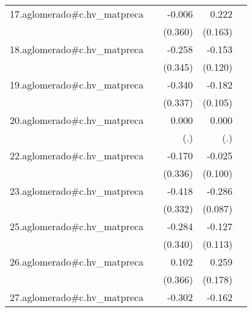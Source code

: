 {\begin{longtable}{l*{4}{D{.}{.}{-1}}}
\addlinespace
17.aglomerado#c.hv\_matpreca&                     &      -0.006         &       0.222         &                     \\
            &                     &     (0.360)         &     (0.163)         &                     \\
\addlinespace
18.aglomerado#c.hv\_matpreca&                     &      -0.258         &      -0.153         &                     \\
            &                     &     (0.345)         &     (0.120)         &                     \\
\addlinespace
19.aglomerado#c.hv\_matpreca&                     &      -0.340         &      -0.182         &                     \\
            &                     &     (0.337)         &     (0.105)         &                     \\
\addlinespace
20.aglomerado#c.hv\_matpreca&                     &       0.000         &       0.000         &                     \\
            &                     &         (.)         &         (.)         &                     \\
\addlinespace
22.aglomerado#c.hv\_matpreca&                     &      -0.170         &      -0.025         &                     \\
            &                     &     (0.336)         &     (0.100)         &                     \\
\addlinespace
23.aglomerado#c.hv\_matpreca&                     &      -0.418         &      -0.286\sym{**} &                     \\
            &                     &     (0.332)         &     (0.087)         &                     \\
\addlinespace
25.aglomerado#c.hv\_matpreca&                     &      -0.284         &      -0.127         &                     \\
            &                     &     (0.340)         &     (0.113)         &                     \\
\addlinespace
26.aglomerado#c.hv\_matpreca&                     &       0.102         &       0.259         &                     \\
            &                     &     (0.366)         &     (0.178)         &                     \\
\addlinespace
27.aglomerado#c.hv\_matpreca&                     &      -0.302         &      -0.162\sym{**} &                     \\

\end{longtable}}
